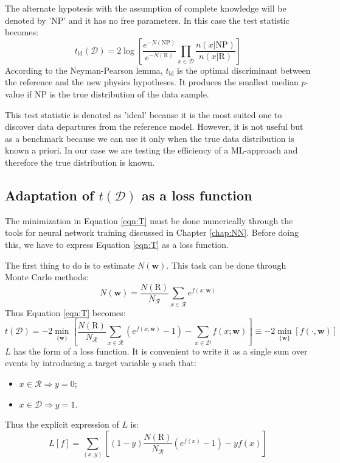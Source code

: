 The alternate hypotesis with the assumption of complete knowledge will be denoted by 'NP' and it has no free parameters. In this case the test statistic becomes:
\begin{equation}
	t_\mathrm{id}(\mathcal{D}) = 2 \log{ 
	\left[
	\frac{e^{-N(\mathrm{NP})}}{e^{-N(\mathrm{R})}}
	\prod_{x \in \mathcal{D}} \frac{n(x|\mathrm{NP})}{n(x|\mathrm{R})}
	\right]
	}
\end{equation}
According to the Neyman-Pearson lemma, $t_\mathrm{id}$ is the optimal discriminant between the reference and the new physics hypotheses. It produces the smallest median $p$-value if NP is the true distribution of the data sample.

This test statistic is denoted as 'ideal' because it is the most suited one to discover data departures from the reference model. However, it is not useful but as a benchmark because we can use it only when the true data distribution is known a priori. In our case we are testing the efficiency of a ML-approach and therefore the true distribution is known.



\subsection{Adaptation of $t(\mathcal{D})$ as a loss function}
The minimization in Equation \ref{eqn:T} must be done numerically through the tools for neural network training discussed in Chapter \ref{chap:NN}. Before doing this, we have to express Equation \ref{eqn:T} as a loss function.

The first thing to do is to estimate $N(\mathbf{w})$. This task can be done through Monte Carlo methods:
\begin{equation}
	N(\mathbf{w}) = \frac{N(\mathrm{R})}{N_{\mathcal{R}}} \sum_{x \in \mathcal{R}} e^{f(x;\mathbf{w})}
\end{equation}
Thus Equation \ref{eqn:T} becomes:
\begin{equation}
	t(\mathcal{D}) = -2 \min_{\{\mathbf{w}\}}{\left[
	\frac{N(\mathrm{R})}{N_{\mathcal{R}}} \sum_{x \in \mathcal{R}} (e^{f(x;\mathbf{w})} -1) -
	\sum_{x \in \mathcal{D}} f(x;\mathbf{w})
	\right]}
	\equiv
	-2 \min_{\{\mathbf{w}\}}{\left[ f(\cdot,\mathbf{w}) \right]}
\end{equation}
$L$ has the form of a loss function. It is convenient to write it as a single sum over events by introducing a target variable $y$ such that:
\begin{itemize}
	\item $x \in \mathcal{R} \Longrightarrow y=0$;
	\item $x \in \mathcal{D} \Longrightarrow y=1$.
\end{itemize}
Thus the explicit expression of $L$ is:
\begin{equation}
	L[f] = \sum_{(x,y)} \left[
	(1-y) \frac{N(\mathrm{R})}{N_{\mathcal{R}}} (e^{f(x)} - 1) - yf(x)
	\right]
\end{equation}

